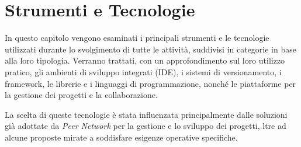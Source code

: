 \chapter{Strumenti e Tecnologie}
In questo capitolo vengono esaminati i principali strumenti e le tecnologie utilizzati durante lo svolgimento di tutte le attività, suddivisi in categorie
in base alla loro tipologia. Verranno trattati, con un approfondimento sul loro utilizzo pratico, gli ambienti di sviluppo integrati (IDE), i sistemi di
versionamento, i framework, le librerie e i linguaggi di programmazione, nonché le piattaforme per la gestione dei progetti e la collaborazione.

La scelta di queste tecnologie è stata influenzata principalmente dalle soluzioni già adottate da \textit{Peer Network} per la gestione e lo sviluppo dei progetti, 
ltre ad alcune proposte mirate a soddisfare esigenze operative specifiche.

